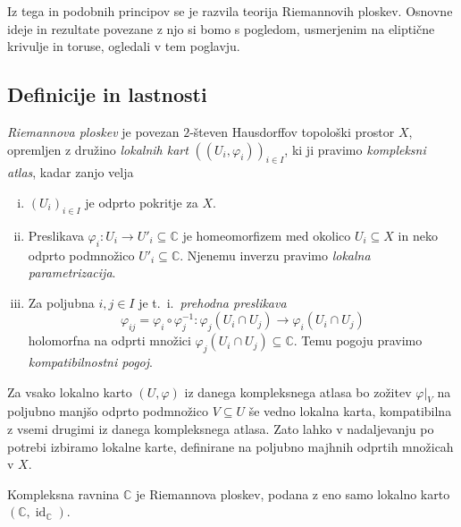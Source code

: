 \documentclass[mat1]{fmfdelo}
\numberwithin{equation}{section}
\newcommand{\C}{\mathbb C}
\newcommand{\inv}{^{-1}}
\newcommand{\ti}{t.~i.\ }
\newcommand{\oz}{oz.\ }
\DeclareMathOperator{\id}{id}
\theoremstyle{definition}
\begin{document}
Iz tega in podobnih principov se je razvila teorija Riemannovih ploskev. Osnovne ideje in rezultate povezane z njo si bomo s pogledom, usmerjenim na eliptične krivulje in toruse, ogledali v tem poglavju.



\subsection{Definicije in lastnosti}


\begin{definicija}
    \emph{Riemannova ploskev} je povezan $2$-števen Hausdorffov topološki prostor $X$, opremljen z družino \emph{lokalnih kart} $((U_i, \varphi_i))_{i \in I}$, ki ji pravimo \emph{kompleksni atlas}, kadar zanjo velja
    \begin{enumerate}[(i)]
        \item $(U_i)_{i \in I}$ je odprto pokritje za $X$.
        \item Preslikava $\varphi_i : U_i \to U'_i \subseteq \C$ je homeomorfizem med okolico $U_i \subseteq X$ in neko odprto podmnožico $U'_i \subseteq \C$. Njenemu inverzu pravimo \emph{lokalna parametrizacija}.
        \item Za poljubna $i,j \in I$ je \ti \emph{prehodna preslikava}
        \[
            \varphi_{ij} = \varphi_i \circ \varphi_j\inv : \varphi_j(U_i \cap U_j) \longrightarrow  \varphi_i(U_i \cap U_j)   
        \]
        holomorfna na odprti množici $\varphi_j(U_i \cap U_j) \subseteq \C$. Temu pogoju pravimo \emph{kompatibilnostni pogoj}.
    \end{enumerate}
\end{definicija}

\begin{opomba}
    Za vsako lokalno karto $(U, \varphi)$ iz danega kompleksnega atlasa bo zožitev $\varphi|_V$ na poljubno manjšo odprto podmnožico $V \subseteq U$ še vedno lokalna karta, kompatibilna z vsemi drugimi iz danega kompleksnega atlasa. Zato lahko v nadaljevanju po potrebi izbiramo lokalne karte, definirane na poljubno majhnih odprtih množicah v $X$. 
\end{opomba}

\begin{primer*}
    Kompleksna ravnina $\C$ je Riemannova ploskev, podana z eno samo lokalno karto $(\C, \id_\C)$. 
\end{primer*}
\end{document}
